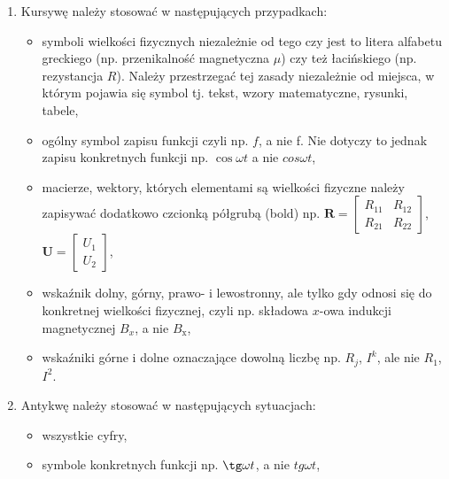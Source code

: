 \documentclass[12pt,twoside]{mwart}
\begin{document}
\begin{enumerate}[label=\arabic*), leftmargin=1.25cm]
\item Kursywę należy stosować w następujących przypadkach:

\begin{itemize}[label=-,labelsep=0.4cm,leftmargin=0.6cm] %
\item symboli wielkości fizycznych niezależnie od tego czy jest to litera alfabetu greckiego (np. przenikalność magnetyczna $\mu$) czy też łacińskiego (np. rezystancja $R$). Należy przestrzegać tej zasady niezależnie od miejsca, w którym pojawia się symbol tj. tekst, wzory matematyczne, rysunki, tabele,

\item ogólny symbol zapisu funkcji czyli np. $f$, a nie f. Nie dotyczy to jednak zapisu konkretnych funkcji np. $\cos \omega t$ a nie $cos \omega t$,

\item macierze, wektory, których elementami są wielkości fizyczne należy zapisywać dodatkowo czcionką półgrubą (bold) np. 
$\bm{R} = \left[ 
\begin{array}{cc}
R_{11} & R_{12} \\
R_{21} & R_{22} 
\end{array} 
\right]$,
$\bm{U} = \left[ 
\begin{array}{c}
U_{1} \\
U_{2} 
\end{array} 
\right]$,

\item wskaźnik dolny, górny, prawo- i lewostronny, ale tylko gdy odnosi się do konkretnej wielkości fizycznej, czyli np. składowa $x$-owa indukcji magnetycznej $B_x$, a nie $B_{\mathrm{x}}$,

\item wskaźniki górne i dolne oznaczające dowolną liczbę np. $R_j$, $I^k$, ale nie $R_\mathit{1}$, $I^\mathit{2}$.

\end{itemize}

\item Antykwę należy stosować w następujących sytuacjach:

\begin{itemize}[label=-,labelsep=0.4cm,leftmargin=0.6cm]
\item wszystkie cyfry,

\item symbole konkretnych funkcji np. $\tg \omega t$, a nie $tg \omega t$,


\end{itemize}
\end{enumerate}
\end{document}
